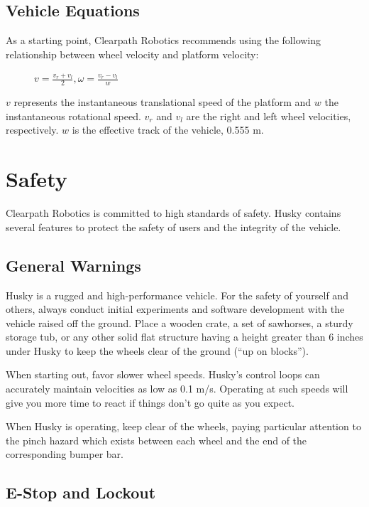 \documentclass[]{clearpath-latex/clearpath-manual}
\begin{document}
\newpage
\subsection{Vehicle Equations}

As a starting point, Clearpath Robotics recommends using the following relationship between wheel velocity and platform velocity:
\begin{figure}[h]
\centering
$v=\frac{v_r+v_l}{2} , \omega=\frac{v_r-v_l}{w}$
\end{figure}

$v$ represents the instantaneous translational speed of the platform and $w$ the instantaneous rotational speed. $v_r$ and $v_l$ are
the right and left wheel velocities, respectively. $w$ is the effective track of the vehicle, 0.555 m.

\section{Safety}
Clearpath Robotics is committed to high standards of safety. Husky contains several features to protect the safety of users and the integrity of the vehicle.

\subsection{General Warnings}

Husky is a rugged and high-performance vehicle. For the safety of yourself and others, 
always conduct initial experiments and software development with the vehicle raised off the ground. 
Place a wooden crate, a set of sawhorses, a sturdy storage tub, or any other solid flat structure having a 
height greater than 6 inches under Husky to keep the wheels clear of the ground (“up on blocks”).

When starting out, favor slower wheel speeds. Husky’s control loops can accurately maintain velocities 
as low as 0.1 m/s. Operating at such speeds will give you more time to react if things don’t go quite as you expect.

When Husky is operating, keep clear of the wheels, paying particular attention to the pinch hazard which exists between each wheel and the end of the corresponding bumper bar.

\subsection{E-Stop and Lockout}
\end{document}

